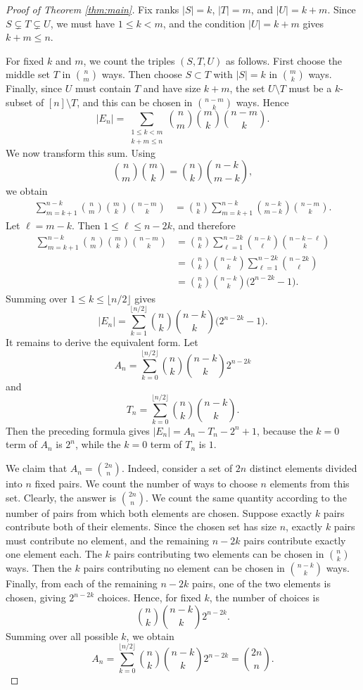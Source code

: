 \documentclass[10pt,a4paper]{amsart}
\begin{document}
\begin{proof}[Proof of Theorem \ref{thm:main}]
Fix ranks $|S|=k$, $|T|=m$, and $|U|=k+m$. Since
$S\subsetneq T\subsetneq U$,
we must have $1\leq k<m$, and the condition $|U|=k+m$ gives $k+m\leq n$.

For fixed $k$ and $m$, we count the triples $(S,T,U)$ as follows. First choose the middle set $T$ in $\binom{n}{m}$ ways. Then choose $S\subset T$ with $|S|=k$ in $\binom{m}{k}$ ways. Finally, since $U$ must contain $T$ and have size $k+m$, the set $U\setminus T$ must be a $k$-subset of $[n]\setminus T$, and this can be chosen in $\binom{n-m}{k}$ ways. Hence
\[
|E_n|
=
\sum_{\substack{1\leq k<m\\ k+m\leq n}}
\binom{n}{m}\binom{m}{k}\binom{n-m}{k}.
\]
We now transform this sum. Using
\[
\binom{n}{m}\binom{m}{k}
=
\binom{n}{k}\binom{n-k}{m-k},
\]
we obtain
\begin{align*}
\sum_{m=k+1}^{n-k}\binom{n}{m}\binom{m}{k}\binom{n-m}{k}
&=
\binom{n}{k}
\sum_{m=k+1}^{n-k}
\binom{n-k}{m-k}\binom{n-m}{k}.
\end{align*}
Let $\ell=m-k$. Then $1\leq \ell\leq n-2k$, and therefore
\begin{align*}
\sum_{m=k+1}^{n-k}\binom{n}{m}\binom{m}{k}\binom{n-m}{k}
&=
\binom{n}{k}
\sum_{\ell=1}^{n-2k}
\binom{n-k}{\ell}\binom{n-k-\ell}{k}  \\
&=
\binom{n}{k}\binom{n-k}{k}
\sum_{\ell=1}^{n-2k}
\binom{n-2k}{\ell}  \\
&=
\binom{n}{k}\binom{n-k}{k}
\bigl(2^{n-2k}-1\bigr).
\end{align*}
Summing over $1\leq k\leq \lfloor n/2\rfloor$ gives
\[
|E_n|
=
\sum_{k=1}^{\lfloor n/2\rfloor}
\binom{n}{k}\binom{n-k}{k}
\bigl(2^{n-2k}-1\bigr).
\]
It remains to derive the equivalent form. Let
\[
A_n=
\sum_{k=0}^{\lfloor n/2\rfloor}
\binom{n}{k}\binom{n-k}{k}2^{n-2k}
\]
and
\[
T_n=
\sum_{k=0}^{\lfloor n/2\rfloor}
\binom{n}{k}\binom{n-k}{k}.
\]
Then the preceding formula gives
$|E_n|=A_n-T_n-2^n+1$,
because the $k=0$ term of $A_n$ is $2^n$, while the $k=0$ term of $T_n$ is $1$.

We claim that
$A_n=\binom{2n}{n}$.
Indeed, consider a set of \(2n\) distinct elements divided into \(n\) fixed
pairs. We count the number of ways to choose \(n\) elements from this set.
Clearly, the answer is \(\binom{2n}{n}\).
We count the same quantity according to the number of pairs from which both
elements are chosen. Suppose exactly \(k\) pairs contribute both of their
elements. Since the chosen set has size \(n\), exactly \(k\) pairs must
contribute no element, and the remaining \(n-2k\) pairs contribute exactly
one element each. The \(k\) pairs contributing two elements can be chosen in
\(\binom{n}{k}\) ways. Then the \(k\) pairs contributing no element can be
chosen in \(\binom{n-k}{k}\) ways. Finally, from each of the remaining
\(n-2k\) pairs, one of the two elements is chosen, giving \(2^{n-2k}\)
choices. Hence, for fixed \(k\), the number of choices is
\[
\binom{n}{k}\binom{n-k}{k}2^{n-2k}.
\]
Summing over all possible \(k\), we obtain
\[
A_n
=
\sum_{k=0}^{\lfloor n/2\rfloor}
\binom{n}{k}\binom{n-k}{k}2^{n-2k}
=
\binom{2n}{n}.
\]


\end{proof}
\end{document}
